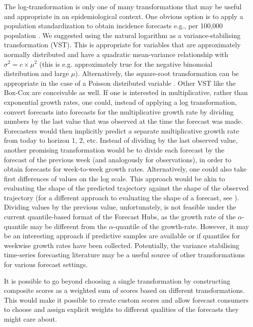 \documentclass[10pt,letterpaper]{article}
\begin{document}
The log-transformation is only one of many transformations that may be useful and appropriate in an epidemiological context. One obvious option is to apply a population standardization to obtain incidence forecasts e.g., per 100,000 population \cite{abbottEvaluatingEpidemiologicallyMotivated2022}. 
We suggested using the natural logarithm as a variance-stabilising transformation (VST). This is appropriate for variables that are approximately normally distributed and have a quadratic mean-variance relationship with $\sigma^2 = c \times \mu^2$ (this is e.g. approximately true for the negative binomoial distribution and large $\mu$). Alternatively, the square-root transformation can be appropriate in the case of a Poisson distributed variable \cite{dunnGeneralizedLinearModels2018}. Other VST like the Box-Cox \cite{boxAnalysisTransformations1964} are conceivable as well.
If one is interested in multiplicative, rather than exponential growth rates, one could, instead of applying a log transformation, convert forecasts into forecasts for the multiplicative growth rate by dividing numbers by the last value that was observed at the time the forecast was made. Forecasters would then implicitly predict a separate multiplicative growth rate from today to horizon 1, 2, etc. 
Instead of dividing by the last observed value, another promising transformation would be to divide each forecast by the forecast of the previous week (and analogously for observations), in order to obtain forecasts for week-to-week growth rates. Alternatively, one could also take first differences of values on the log scale. This approach would be akin to evaluating the shape of the predicted trajectory against the shape of the observed trajectory (for a different approach to evaluating the shape of a forecast, see \cite{srivastavaShapebasedEvaluationEpidemic2022}). Dividing values by the previous value, unfortunately, is not feasible under the current quantile-based format of the Forecast Hubs, as the growth rate of the $\alpha$-quantile may be different from the $\alpha$-quantile of the growth-rate. However, it may be an interesting approach if predictive samples are available or if quantiles for weekwise growth rates have been collected. Potentially, the variance stabilising time-series forecasting literature may be a useful source of other transformations for various forecast settings. 

It is possible to go beyond choosing a single transformation by constructing composite scores as a weighted sum of scores based on different transformations. This would make it possible to create custom scores and allow forecast consumers to choose and assign explicit weights to different qualities of the forecasts they might care about.
\end{document}
